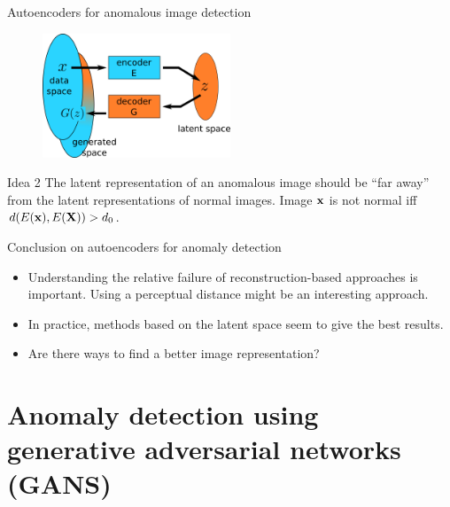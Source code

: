 \documentclass[xcolor=pdftex,dvipsnames,table,mathserif,aspectratio=169]{beamer}
\begin{document}
\begin{frame}{Autoencoders for anomalous image detection}

  \begin{figure}[ht]
    \centering
    \includegraphics[width=0.5\textwidth]{ae.png}
  \end{figure}

  \begin{block}{Idea 2}
    The latent representation of an anomalous image should be ``far away'' from the latent representations of normal images. Image $\mathbf{x}$ is not normal iff $d(E(\mathbf{x}), E(\mathbf{X})) > d_0$.
  \end{block}

\end{frame}

\begin{frame}{Conclusion on autoencoders for anomaly detection}

  \begin{itemize}
  \item Understanding the relative failure of reconstruction-based approaches is important. Using a perceptual distance might be an interesting approach.
  \item In practice, methods based on the latent space seem to give the best results.
  \item Are there ways to find a better image representation?
  \end{itemize}

\end{frame}


\section{Anomaly detection using generative adversarial networks (GANS)}
\end{document}
